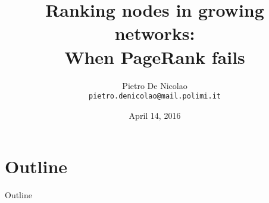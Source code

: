 \documentclass[utf8]{beamer}
\title[When PageRank fails]{Ranking nodes in growing networks: \\ When PageRank fails}
\author[De Nicolao]{Pietro De Nicolao \\ \texttt{pietro.denicolao@mail.polimi.it}}
\date{April 14, 2016}
\institute{Politecnico di Milano}
\begin{document}
\begin{frame}
    \titlepage
\end{frame}

\section*{Outline}
\begin{frame}{Outline}
    \tableofcontents
\end{frame}








\appendix

\end{document}
